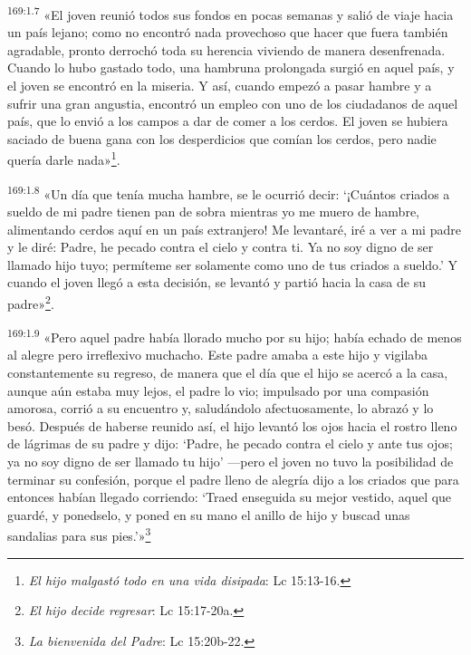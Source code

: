 \par
\textsuperscript{169:1.7} «El joven reunió todos sus fondos en pocas semanas y salió de viaje hacia un país lejano; como no encontró nada provechoso que hacer que fuera también agradable, pronto derrochó toda su herencia viviendo de manera desenfrenada. Cuando lo hubo gastado todo, una hambruna prolongada surgió en aquel país, y el joven se encontró en la miseria. Y así, cuando empezó a pasar hambre y a sufrir una gran angustia, encontró un empleo con uno de los ciudadanos de aquel país, que lo envió a los campos a dar de comer a los cerdos. El joven se hubiera saciado de buena gana con los desperdicios que comían los cerdos, pero nadie quería darle nada»\footnote{\textit{El hijo malgastó todo en una vida disipada}: Lc 15:13-16.}.

\par
\textsuperscript{169:1.8} «Un día que tenía mucha hambre, se le ocurrió decir: `¡Cuántos criados a sueldo de mi padre tienen pan de sobra mientras yo me muero de hambre, alimentando cerdos aquí en un país extranjero! Me levantaré, iré a ver a mi padre y le diré: Padre, he pecado contra el cielo y contra ti. Ya no soy digno de ser llamado hijo tuyo; permíteme ser solamente como uno de tus criados a sueldo.' Y cuando el joven llegó a esta decisión, se levantó y partió hacia la casa de su padre»\footnote{\textit{El hijo decide regresar}: Lc 15:17-20a.}.

\par
\textsuperscript{169:1.9} «Pero aquel padre había llorado mucho por su hijo; había echado de menos al alegre pero irreflexivo muchacho. Este padre amaba a este hijo y vigilaba constantemente su regreso, de manera que el día que el hijo se acercó a la casa, aunque aún estaba muy lejos, el padre lo vio; impulsado por una compasión amorosa, corrió a su encuentro y, saludándolo afectuosamente, lo abrazó y lo besó. Después de haberse reunido así, el hijo levantó los ojos hacia el rostro lleno de lágrimas de su padre y dijo: `Padre, he pecado contra el cielo y ante tus ojos; ya no soy digno de ser llamado tu hijo' ---pero el joven no tuvo la posibilidad de terminar su confesión, porque el padre lleno de alegría dijo a los criados que para entonces habían llegado corriendo: `Traed enseguida su mejor vestido, aquel que guardé, y ponedselo, y poned en su mano el anillo de hijo y buscad unas sandalias para sus pies.'»\footnote{\textit{La bienvenida del Padre}: Lc 15:20b-22.}

